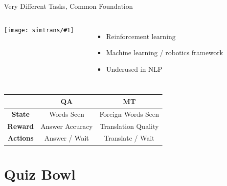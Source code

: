 \documentclass[compress]{beamer}
\newcommand{\gfxs}[2]{
\begin{center}
	\texttt{[image: simtrans/\#1]}
\end{center}
}
\begin{document}
\begin{frame}{Very Different Tasks, Common Foundation}

\begin{columns}
  \gfxs{pancake_robot}{.4}
  \begin{center}
  \end{center}
  
  \begin{itemize}
    \item Reinforcement learning
    \item Machine learning / robotics framework
    \item Underused in NLP
  \end{itemize}
\end{columns}

\vspace{-.5cm}

  \begin{center}
\begin{tabular}{ccc}
\hline
  & QA & MT \\
\hline
{\bf State} & Words Seen & Foreign Words Seen \\
{\bf Reward} & Answer Accuracy & Translation Quality \\
{\bf Actions} & Answer / Wait & Translate / Wait \\
\hline
\end{tabular}

  \end{center}

\end{frame}

\section{Quiz Bowl}
\end{document}
